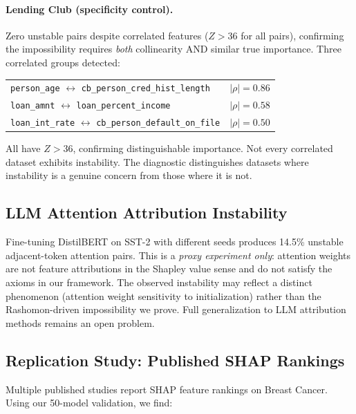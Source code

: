\documentclass{jmlr}
\begin{document}
\paragraph{Lending Club (specificity control).}
Zero unstable pairs despite correlated features ($Z > 36$ for all pairs), confirming the impossibility requires \emph{both} collinearity AND similar true importance. Three correlated groups detected:

\begin{center}
\footnotesize
\begin{tabular}{@{}ll@{}}
\texttt{person\_age} $\leftrightarrow$ \texttt{cb\_person\_cred\_hist\_length} & $|\rho| = 0.86$ \\
\texttt{loan\_amnt} $\leftrightarrow$ \texttt{loan\_percent\_income} & $|\rho| = 0.58$ \\
\texttt{loan\_int\_rate} $\leftrightarrow$ \texttt{cb\_person\_default\_on\_file} & $|\rho| = 0.50$ \\
\end{tabular}
\end{center}

\noindent All have $Z > 36$, confirming distinguishable importance. Not every correlated dataset exhibits instability. The diagnostic distinguishes datasets where instability is a genuine concern from those where it is not.

\subsection{LLM Attention Attribution Instability}

Fine-tuning DistilBERT on SST-2 with different seeds produces 14.5\% unstable adjacent-token attention pairs. This is a \emph{proxy experiment only}: attention weights are not feature attributions in the Shapley value sense and do not satisfy the axioms in our framework. The observed instability may reflect a distinct phenomenon (attention weight sensitivity to initialization) rather than the Rashomon-driven impossibility we prove. Full generalization to LLM attribution methods remains an open problem.

\subsection{Replication Study: Published SHAP Rankings}

Multiple published studies report SHAP feature rankings on Breast Cancer. Using our 50-model validation, we find:
\end{document}
